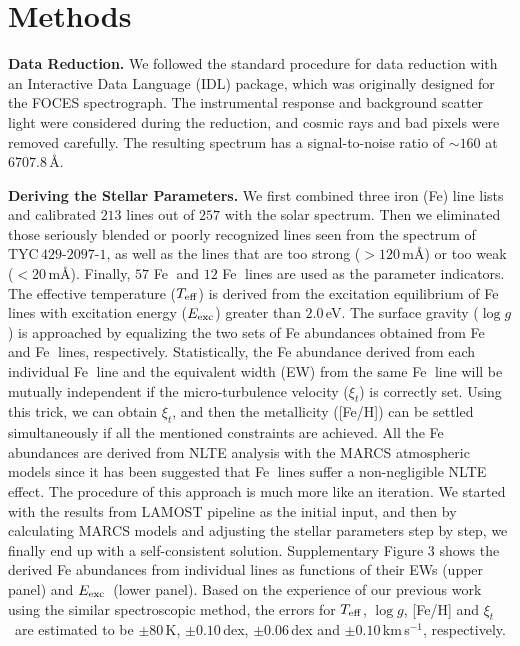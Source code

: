 \documentclass[twoside,onecolumnm,12pt]{article}
\newcommand{\upcite}[1]{\textsuperscript{\textsuperscript{\cite{#1}}}}
\newcommand{\Teff}{$T_{\rm eff}$}
\newcommand{\logg}{$\log g$}
\newcommand{\Vt}  {$\xi_t$}
\newcommand{\kms}{km\,s$^{-1}$}
\newcommand{\Eexc}{$E_{\rm exc}$}
\newcommand{\starname}{TYC\,$429$-$2097$-$1$}
\newcommand\ion[2]{#1$\;${\scriptsize\rmfamily\uppercase\expandafter{\romannumeral#2}}\relax}
\begin{document}
\section*{Methods}

\noindent\textbf{Data Reduction.} We followed the standard procedure for data reduction with an Interactive Data Language (IDL) package, which was originally designed for the FOCES spectrograph\upcite{Pfeiffer1998}. The instrumental response and background scatter light were considered during the reduction, and cosmic rays and bad pixels were removed carefully. The resulting spectrum has a signal-to-noise ratio of $\sim 160$ at $6707.8$\,\AA.


\vspace{10pt}
\noindent\textbf{Deriving the Stellar Parameters.} We first combined three iron (Fe) line lists\upcite{Takeda2002, Mashonkina2011, Carlberg2012} and calibrated $213$ lines out of $257$ with the solar spectrum\upcite{Kurucz1984}. Then we eliminated those seriously blended or poorly recognized lines seen from the spectrum of \starname, as well as the lines that are too strong ($> 120$\,m\AA) or too weak ($< 20$\,m\AA). Finally, $57$ \ion{Fe}{1} and $12$ \ion{Fe}{2} lines are used as the parameter indicators. The effective temperature (\Teff) is derived from the excitation equilibrium of \ion{Fe}{1} lines with excitation energy (\Eexc) greater than $2.0$\,eV\upcite{Sitnova2015}. The surface gravity (\logg) is approached by equalizing the two sets of Fe abundances obtained from \ion{Fe}{1} and \ion{Fe}{2} lines, respectively. Statistically, the Fe abundance derived from each individual \ion{Fe}{1} line and the equivalent width (EW) from the same \ion{Fe}{1} line will be mutually independent if the micro-turbulence velocity (\Vt) is correctly set. Using this trick, we can obtain \Vt, and then the metallicity ([Fe/H]) can be settled simultaneously if all the mentioned constraints are achieved. All the Fe abundances are derived from NLTE analysis with the MARCS atmospheric models\upcite{Gustafsson2008} since it has been suggested that \ion{Fe}{1} lines suffer a non-negligible NLTE effect\upcite{Mashonkina2011}. The procedure of this approach is much more like an iteration. We started with the results from LAMOST pipeline as the initial input, and then by calculating MARCS models and adjusting the stellar parameters step by step, we finally end up with a self-consistent solution. Supplementary Figure 3 shows the derived Fe abundances from individual lines as functions of their EWs (upper panel) and \Eexc\ (lower panel). Based on the experience of our previous work using the similar spectroscopic method, the errors for \Teff, \logg, [Fe/H] and \Vt\ are estimated to be $\pm 80$\,K, $\pm 0.10$\,dex, $\pm0.06$\,dex and $\pm 0.10$\,\kms, respectively.
\end{document}

